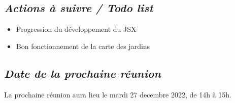 \documentclass[french,a4paper]{article}
\begin{document}
\subsection*{\textit{Actions à suivre / Todo list}}
\begin{itemize}
  \item Progression du développement du JSX
  \item Bon fonctionnement de la carte des jardins
\end{itemize}

\subsection*{\textit{Date de la prochaine réunion}}
La prochaine réunion aura lieu le mardi 27 decembre 2022, de 14h à 15h.
\end{document}
